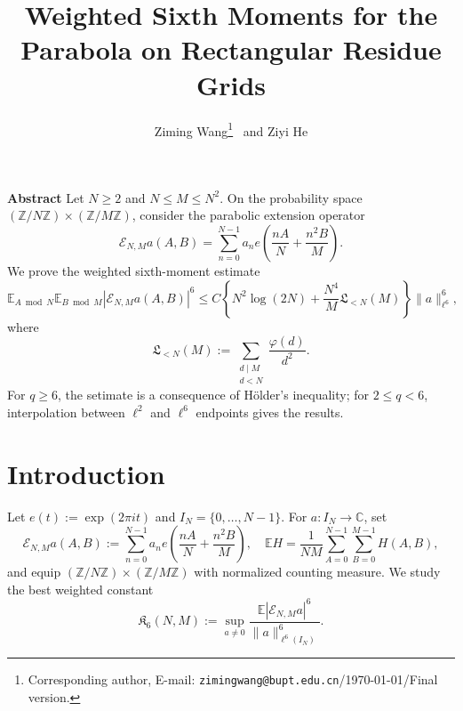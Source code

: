 \documentclass[11pt, twoside]{article}
\numberwithin{equation}{section}
\theoremstyle{definition}
\newcommand{\Z}{\mathbb Z}
\newcommand{\C}{\mathbb C}
\newcommand{\E}{\mathbb E}
\newcommand{\cE}{\mathcal E}
\newcommand{\Lcal}{\mathfrak L}
\newcommand{\Ksix}{\mathfrak K_6}
\begin{document}
\title{\bf\Large Weighted Sixth Moments for the Parabola on Rectangular Residue Grids
}
\author{Ziming Wang\footnote{Corresponding author,
E-mail: \texttt{zimingwang@bupt.edu.cn}/{\color{red}\today}/Final version.}
\ and Ziyi He}
\date{}
\maketitle	
\vspace{-0.8cm}
	
\begin{center}
\begin{minipage}{13cm}
{\small {\bf Abstract}\quad   
Let $N\geq 2$ and $N\leq M\leq N^2$.  On the probability space
$(\Z/N\Z)\times(\Z/M\Z)$, consider the parabolic extension operator
$$
\cE_{N,M}a(A,B)=\sum_{n=0}^{N-1}a_n e\!\left(\frac{nA}{N}+\frac{n^2B}{M}\right).
$$
We prove the weighted sixth-moment estimate
$$
\E_{A\bmod N}\E_{B\bmod M}|\cE_{N,M}a(A,B)|^6
\leq C\left\{N^2\log(2N)+\frac{N^4}{M}\Lcal_{<N}(M)\right\}
\|a\|_{\ell^6}^6,
$$
where
$$
\Lcal_{<N}(M):=\sum_{\substack{d\mid M\\d<N}}\frac{\varphi(d)}{d^2}.
$$
For $q\ge 6$, the setimate is a consequence of H\"older's inequality; for $2\le q<6$, interpolation between $\ell^2$ and $\ell^6$
endpoints gives the results.}
\end{minipage}
\end{center}


\section{Introduction}
Let $e(t):=\exp(2\pi i t)$ and $I_N=\{0,\ldots,N-1\}$. For $a:I_N\to\C$, set
$$
\cE_{N,M}a(A,B)
:=
\sum_{n=0}^{N-1}a_n e\!\left(\frac{nA}{N}+\frac{n^2B}{M}\right), \quad \E H=\frac1{NM}\sum_{A=0}^{N-1}\sum_{B=0}^{M-1}H(A,B),
$$
and equip $(\Z/N\Z)\times(\Z/M\Z)$ with normalized counting measure.
We study the best weighted constant
$$
\Ksix(N,M)
:=
\sup_{a\neq0}\frac{
\E |\cE_{N,M}a|^6}
{\|a\|_{\ell^6(I_N)}^6}.
$$
\end{document}
